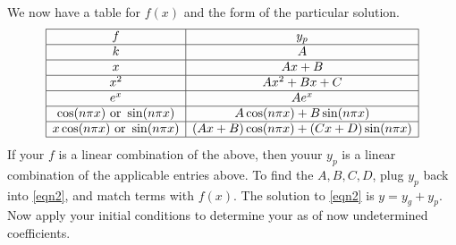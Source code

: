 \documentclass{article}
\begin{document}
We now have a table for $f(x)$ and the form of the particular solution.
\[
\begin{array}{|c|c|}
\hline
f & y_p\\\hline
k & A\\\hline
x & Ax+B\\\hline
x^2 & Ax^2+Bx+C\\\hline
e^x & Ae^x\\\hline
\cos(n\pi x) \text{ or } \sin(n\pi x) & A\cos(n\pi x) + B\sin(n\pi x)\\\hline
x\cos(n\pi x) \text{ or } \sin(n\pi x) & (Ax+B)\cos(n\pi x) + (Cx +D)\sin(n\pi x)\\\hline
\end{array}
\]
If your $f$ is a linear combination of the above, then youur $y_p$ is a linear combination of the applicable entries above.
To find the $A,B,C,D$, plug $y_p$ back into \autoref{eqn2}, and match terms with $f(x)$.
The solution to \autoref{eqn2} is $y=y_g+y_p$.
Now apply your initial conditions to determine your as of now undetermined coefficients.
\end{document}
